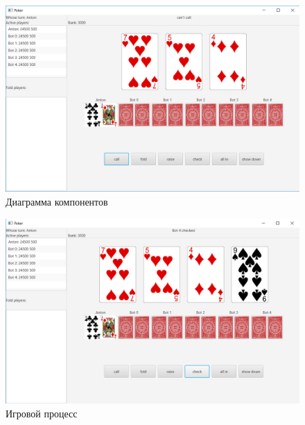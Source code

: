 \begin{figure}[H]
	\begin{center}
		\includegraphics[scale=0.5]{pics/5.png}
	    \caption{Диаграмма компонентов} 
		\label{pic:gui:5}
	\end{center}
\end{figure}

\begin{figure}[H]
	\begin{center}
		\includegraphics[scale=0.5]{pics/6.png}
	    \caption{Игровой процесс} 
		\label{pic:gui:6}
	\end{center}
\end{figure}

